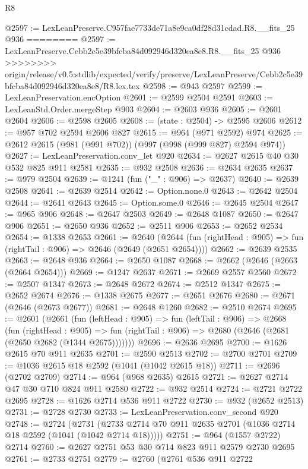 \begin{lexlean}{R8}
\begin{coremodule}
{{{{{{{{{{{{{{{{{{{{{{{{{{{{{{{{{{{{{{{{{{{{{@2597 := LexLeanPreserve.C957fae7733de71a8e9ca0df28d31cdad.R8.__fits_25 @936
========
@2597 := LexLeanPreserve.Cebb2c5e39bfcba84d092946d320ea8e8.R8.__fits_25 @936
>>>>>>>> origin/release/v0.5:stdlib/expected/verify/preserve/LexLeanPreserve/Cebb2c5e39bfcba84d092946d320ea8e8/R8.lex.tex
@2598 := @943 @2597
@2599 := LexLeanPreservation.encOption
@2601 := @2599 @2504 @2591
@2603 := LexLeanStd.Order.mergeStep @903
@2604 := @2603 @936
@2605 := @2601 @2604
@2606 := @2598 @2605
@2608 := (state : @2504) -> @2595 @2606
@2612 := @957 @702 @2594 @2606 @827
@2615 := @964 (@971 @2592) @974
@2625 := @2612 @2615 (@981 (@991 @702)) (@997 (@998 (@999 @827) @2594 @974))
@2627 := LexLeanPreservation.conv_let @920
@2634 := @2627 @2615 @40 @30 @532 @825 @911 @2581
@2635 := @932 @2508
@2636 := @2634 @2635
@2637 := @979 @2504
@2639 := @1241 (fun ("_" : @906) => @2637)
@2640 := @2639 @2508
@2641 := @2639 @2514
@2642 := Option.none.{0}
@2643 := @2642 @2504
@2644 := @2641 @2643
@2645 := Option.some.{0}
@2646 := @2645 @2504
@2647 := @965 @906
@2648 := @2647 @2503
@2649 := @2648 @1087
@2650 := @2647 @906
@2651 := @2650 @936
@2652 := @2511 @906
@2653 := @2652 @2534
@2654 := @1338 @2653
@2661 := @2640
    (@2644 (fun (rightHead : @905) => fun (rightTail : @906) => @2646 (@2649 (@2651 @2654))))
@2662 := @2639 @2535
@2663 := @2648 @936
@2664 := @2650 @1087
@2668 := @2662 (@2646 (@2663 (@2664 @2654)))
@2669 := @1247 @2637
@2671 := @2669 @2557 @2560
@2672 := @2507 @1347
@2673 := @2648 @2672
@2674 := @2512 @1347
@2675 := @2652 @2674
@2676 := @1338 @2675
@2677 := @2651 @2676
@2680 := @2671 (@2646 (@2673 @2677))
@2681 := @2648 @1260
@2682 := @2510 @2674
@2695 := @2601
    (@2661
      (fun (leftHead : @905) =>
      fun (leftTail : @906) =>
      @2668
        (fun (rightHead : @905) =>
        fun (rightTail : @906) => @2680 (@2646 (@2681 (@2650 @2682 (@1344 @2675)))))))
@2696 := @2636 @2695
@2700 := @1626 @2615 @70 @911 @2635
@2701 := @2590 @2513
@2702 := @2700 @2701
@2709 := @1036 @2615 @18 @2592 (@1041 (@1042 @2615 @18))
@2711 := @2696 (@2702 @2709)
@2714 := @964 (@968 @2635) @2615
@2721 := @2627 @2714 @47 @30 @710 @824 @911 @2580
@2722 := @932 @2514
@2724 := @2721 @2722 @2695
@2728 := @1626 @2714 @536 @911 @2722
@2730 := @932 (@2652 @2513)
@2731 := @2728 @2730
@2733 := LexLeanPreservation.conv_second @920
@2748 := @2724
    (@2731 (@2733 @2714 @70 @911 @2635 @2701 (@1036 @2714 @18 @2592 (@1041 (@1042 @2714 @18)))))
@2751 := @964 (@1557 @2722) @2714
@2760 := @2627 @2751 @53 @30 @714 @823 @911 @2579 @2730 @2695
@2761 := @2733 @2751
@2779 := @2760
    (@2761
      @536
      @911
      @2722
}}}}}}}}}}}}}}}}}}}}}}}}}}}}}}}}}}}}}}}}}}}}}
\end{coremodule}
\end{lexlean}
